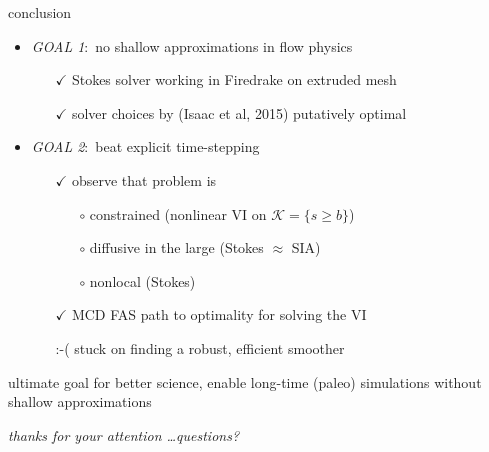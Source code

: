 \documentclass[usepdftitle=false,usenames,dvipsnames]{beamer}
\begin{document}
\begin{frame}{conclusion}

\begin{itemize}
\item \emph{GOAL 1}:\, no shallow approximations in flow physics
    \begin{itemize}
    \item[{\Large \color{ForestGreen} $\checkmark$}] Stokes solver working in Firedrake on extruded mesh
    \item[{\Large \color{ForestGreen} $\checkmark$}] solver choices by (Isaac et al, 2015) putatively optimal
    \end{itemize}
\item \emph{GOAL 2}:\, beat explicit time-stepping
    \begin{itemize}
    \item[{\Large \color{ForestGreen} $\checkmark$}] observe that problem is
        \begin{itemize}
        \item[{\color{black} $\circ$}] constrained (nonlinear VI on $\mathcal{K} = \{s\ge b\}$)
        \item[{\color{black} $\circ$}] diffusive in the large (Stokes $\approx$ SIA)
        \item[{\color{black} $\circ$}] nonlocal (Stokes)
        \end{itemize}
    \item[{\Large \color{ForestGreen} $\checkmark$}] MCD FAS path to optimality for solving the VI
    \item[{\Large \alert{:-(}}] \alert{stuck on finding a robust, efficient smoother}
    \end{itemize}
\end{itemize}

\begin{block}{ultimate goal}
for better science, enable long-time (paleo) simulations without shallow approximations
\end{block}

\emph{thanks for your attention \dots questions?}
\end{frame}



\end{document}
